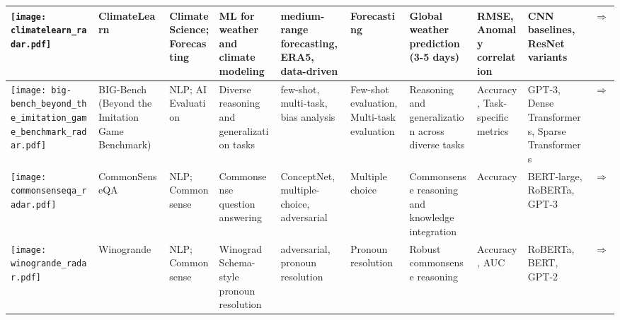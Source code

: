 \begin{landscape}
{\begin{longtable}{|p{}|p{}|p{}|p{}|p{}|p{}|p{}|p{}|p{}|p{}|}
\texttt{[image: climatelearn\_radar.pdf]} & ClimateLearn & Climate Science; Forecasting & ML for weather and climate modeling & medium-range forecasting, ERA5, data-driven & Forecasting & Global weather prediction (3-5 days) & RMSE, Anomaly correlation & CNN baselines, ResNet variants & \cite{nguyen2023climatelearnbenchmarkingmachinelearning}\href{https://arxiv.org/abs/2307.01909}{$\Rightarrow$} \\ \hline
\texttt{[image: big-bench\_beyond\_the\_imitation\_game\_benchmark\_radar.pdf]} & BIG-Bench (Beyond the Imitation Game Benchmark) & NLP; AI Evaluation & Diverse reasoning and generalization tasks & few-shot, multi-task, bias analysis & Few-shot evaluation, Multi-task evaluation & Reasoning and generalization across diverse tasks & Accuracy, Task-specific metrics & GPT-3, Dense Transformers, Sparse Transformers & \cite{srivastava2023imitationgamequantifyingextrapolating}\href{https://github.com/google/BIG-bench}{$\Rightarrow$} \\ \hline
\texttt{[image: commonsenseqa\_radar.pdf]} & CommonSenseQA & NLP; Commonsense & Commonsense question answering & ConceptNet, multiple-choice, adversarial & Multiple choice & Commonsense reasoning and knowledge integration & Accuracy & BERT-large, RoBERTa, GPT-3 & \cite{talmor2019commonsenseqaquestionansweringchallenge}\href{https://paperswithcode.com/paper/commonsenseqa-a-question-answering-challenge}{$\Rightarrow$} \\ \hline
\texttt{[image: winogrande\_radar.pdf]} & Winogrande & NLP; Commonsense & Winograd Schema-style pronoun resolution & adversarial, pronoun resolution & Pronoun resolution & Robust commonsense reasoning & Accuracy, AUC & RoBERTa, BERT, GPT-2 & \cite{sakaguchi2019winograndeadversarialwinogradschema}\href{https://leaderboard.allenai.org/winogrande/submissions/public}{$\Rightarrow$} \\ \hline
\end{longtable}
}

\end{landscape}
